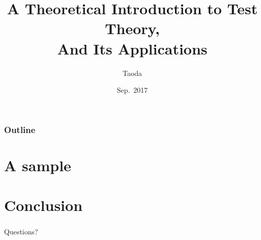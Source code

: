 \documentclass[lualatex]{beamer}
\title[Theoretical Test Theory]{A Theoretical Introduction to Test Theory,\\And Its Applications}
\author{Taoda}
\institute{Alibaba Cloud}
\date{Sep.\ 2017}
\begin{document}
\begin{frame}
\titlepage
\end{frame}

\begin{frame}
  \frametitle{Outline}
  \tableofcontents
\end{frame}

\section{A sample}

\section{Conclusion}

\begin{frame}
  \frametitle{}
  \begin{center}
    \Huge
    Questions?
  \end{center}
\end{frame}
\end{document}
